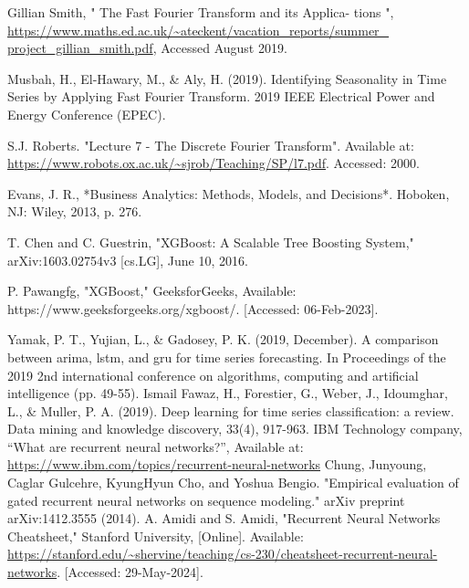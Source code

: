 \documentclass{ieeeojies}
\begin{document}
\begin{thebibliography}{00}
Gillian Smith, " The Fast Fourier Transform and its Applica-
tions ",\url{ https://www.maths.ed.ac.uk/~ateckent/vacation_reports/summer_ project_gillian_smith.pdf}, Accessed August 2019.

Musbah, H., El-Hawary, M., \& Aly, H. (2019). Identifying Seasonality in
Time Series by Applying Fast Fourier Transform. 2019 IEEE Electrical
Power and Energy Conference (EPEC).

S.J. Roberts. "Lecture 7 - The Discrete Fourier Transform". Available at:
\url{https://www.robots.ox.ac.uk/~sjrob/Teaching/SP/l7.pdf}. Accessed: 2000.

Evans, J. R., *Business Analytics: Methods, Models, and Decisions*. Hoboken, NJ: Wiley, 2013, p. 276.

T. Chen and C. Guestrin, "XGBoost: A Scalable Tree Boosting System," arXiv:1603.02754v3 [cs.LG], June 10, 2016.

P. Pawangfg, "XGBoost," GeeksforGeeks, Available: https://www.geeksforgeeks.org/xgboost/. [Accessed: 06-Feb-2023].

Yamak, P. T., Yujian, L., & Gadosey, P. K. (2019, December). A comparison between arima, lstm, and gru for time series forecasting. In Proceedings of the 2019 2nd international conference on algorithms, computing and artificial intelligence (pp. 49-55).
Ismail Fawaz, H., Forestier, G., Weber, J., Idoumghar, L., \& Muller, P. A. (2019). Deep learning for time series classification: a review. Data mining and knowledge discovery, 33(4), 917-963.
IBM Technology company, “What are recurrent neural networks?”, Available at: \url{https://www.ibm.com/topics/recurrent-neural-networks}
Chung, Junyoung, Caglar Gulcehre, KyungHyun Cho, and Yoshua Bengio. "Empirical evaluation of gated recurrent neural networks on sequence modeling." arXiv preprint arXiv:1412.3555 (2014).
A. Amidi and S. Amidi, "Recurrent Neural Networks Cheatsheet," Stanford University, [Online]. Available: \url{https://stanford.edu/~shervine/teaching/cs-230/cheatsheet-recurrent-neural-networks}. [Accessed: 29-May-2024]. 



\end{thebibliography}






\EOD
\end{document}
